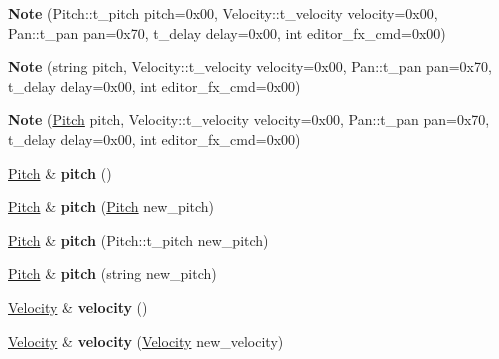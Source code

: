 \begin{DoxyCompactItemize}
\item 
{\bfseries Note} (Pitch\+::t\+\_\+pitch pitch=0x00, Velocity\+::t\+\_\+velocity velocity=0x00, Pan\+::t\+\_\+pan pan=0x70, t\+\_\+delay delay=0x00, int editor\+\_\+fx\+\_\+cmd=0x00)\hypertarget{class_note_af5b21c5cbc213acbe57f927a9a5a2f41}{}\label{class_note_af5b21c5cbc213acbe57f927a9a5a2f41}

\item 
{\bfseries Note} (string pitch, Velocity\+::t\+\_\+velocity velocity=0x00, Pan\+::t\+\_\+pan pan=0x70, t\+\_\+delay delay=0x00, int editor\+\_\+fx\+\_\+cmd=0x00)\hypertarget{class_note_a382691be22ea8a8f2ddbe3dc05200ef5}{}\label{class_note_a382691be22ea8a8f2ddbe3dc05200ef5}

\item 
{\bfseries Note} (\hyperlink{class_pitch}{Pitch} pitch, Velocity\+::t\+\_\+velocity velocity=0x00, Pan\+::t\+\_\+pan pan=0x70, t\+\_\+delay delay=0x00, int editor\+\_\+fx\+\_\+cmd=0x00)\hypertarget{class_note_ac7ade7320aad754f30cdbe6639d5c4a2}{}\label{class_note_ac7ade7320aad754f30cdbe6639d5c4a2}

\item 
\hyperlink{class_pitch}{Pitch} \& {\bfseries pitch} ()\hypertarget{class_note_a2a3b4c8e38515c1ff3366dc8acf43fee}{}\label{class_note_a2a3b4c8e38515c1ff3366dc8acf43fee}

\item 
\hyperlink{class_pitch}{Pitch} \& {\bfseries pitch} (\hyperlink{class_pitch}{Pitch} new\+\_\+pitch)\hypertarget{class_note_a641f04069dff8b5fd8287328bf6cd647}{}\label{class_note_a641f04069dff8b5fd8287328bf6cd647}

\item 
\hyperlink{class_pitch}{Pitch} \& {\bfseries pitch} (Pitch\+::t\+\_\+pitch new\+\_\+pitch)\hypertarget{class_note_a543b0280cb039652847f85f1256a3315}{}\label{class_note_a543b0280cb039652847f85f1256a3315}

\item 
\hyperlink{class_pitch}{Pitch} \& {\bfseries pitch} (string new\+\_\+pitch)\hypertarget{class_note_a713a90345226eecebbc2124d86de9890}{}\label{class_note_a713a90345226eecebbc2124d86de9890}

\item 
\hyperlink{class_velocity}{Velocity} \& {\bfseries velocity} ()\hypertarget{class_note_aae17e8053c15cac46f75344de4010a41}{}\label{class_note_aae17e8053c15cac46f75344de4010a41}

\item 
\hyperlink{class_velocity}{Velocity} \& {\bfseries velocity} (\hyperlink{class_velocity}{Velocity} new\+\_\+velocity)\hypertarget{class_note_a1c6683b331bac07d65371bb6e7b6baea}{}\label{class_note_a1c6683b331bac07d65371bb6e7b6baea}


\end{DoxyCompactItemize}
